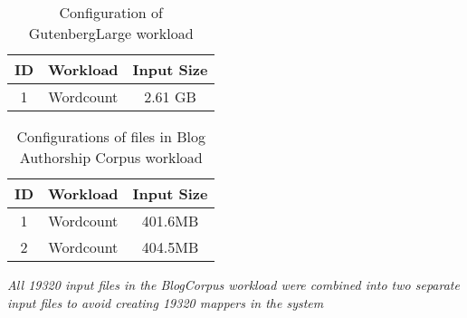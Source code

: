 \documentclass[print,ms]{nuthesis}%
\begin{document}
\begin{table}[H]%
\small
  \begin{center}
     \begin{threeparttable}

    \caption{Configuration of GutenbergLarge workload}
    \label{tab:table3}
    \begin{tabular}{c|c|c}%
     \toprule %
      \textbf{ID} & \textbf{Workload} & \textbf{Input Size}\\
      \hline
      1 & Wordcount & 2.61 GB \\
      \bottomrule %
    \end{tabular}
    \begin{tablenotes}
      \small
      \item %
    \end{tablenotes}
  \end{threeparttable}
  \end{center}
\end{table}

\begin{table}[H]%
\small
  \begin{center}
     \begin{threeparttable}
    \caption{Configurations of files in Blog Authorship Corpus workload}
    \label{tab:table4}
    \begin{tabular}{c|c|c}%
     \toprule %
      \textbf{ID} & \textbf{Workload} & \textbf{Input Size}\\
      \hline
      1 & Wordcount & 401.6MB  \\
      2 & Wordcount & 404.5MB \\
      \bottomrule %
    \end{tabular}
    \begin{tablenotes}
      \small
      \item \textit{All 19320 input files in the BlogCorpus workload were combined into two separate input files to avoid creating 19320 mappers in the system}
    \end{tablenotes}
  \end{threeparttable}
  \end{center}
\end{table}
\end{document}
